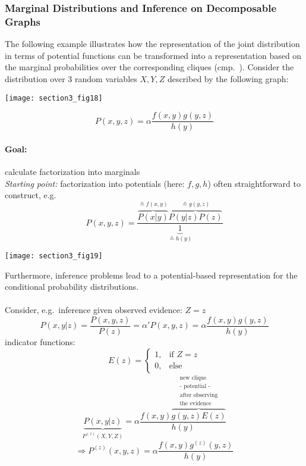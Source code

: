 \newpage 						%
\subsubsection{Marginal Distributions and Inference on Decomposable Graphs}
The following example illustrates how the representation of the joint
distribution in terms of potential functions can be transformed into a
representation based on the marginal probabilities over the
corresponding cliques
(cmp.~\cite[p.~84]{CowellEtAl2003}). Consider the distribution
over 3 random variables $X,Y,Z$ described by the following graph:

\begin{center} \texttt{[image: section3\_fig18]} \end{center}
\begin{equation}\label{eq:potentialRepresentation}
	P(x, y, z) = \alpha \frac{f(x, y) g(y, z)}{h(y)}
\end{equation}

\paragraph{Goal:} calculate factorization into marginals
\\
\emph{Starting point:} factorization into potentials (here: $f,g,h$) often straightforward to construct, e.g.
\begin{equation}
  P(x,y,z) = \frac{ \overbrace{P(x|y)}^{\corresponds f(x,y)}
    \overbrace{P(y|z)P(z)}^{\corresponds g(y,z)}}{
    \underbrace{1}_{\corresponds h(y)}}
\end{equation}
\begin{center} 
  \texttt{[image: section3\_fig19]} 
\end{center}
Furthermore, inference problems lead to a potential-based representation for
the conditional probability distributions. \\\\
Consider, e.g.\ inference given observed evidence: $Z=z$
\begin{equation}
  P(x,y|z) = \frac{P(x,y,z)}{P(z)} = \alpha' P(x,y,z)
  = \alpha \frac{f(x,y) g(y,z)}{h(y)}
\end{equation}
indicator functions:
\begin{equation}
  E(z) = \left \{ \begin{array}{ll}
      1, & \text{if } Z = z\\
      0, & \text{else}
    \end{array} \right.
\end{equation}
\begin{equation}
  \underbrace{P(x,y|z)}_{P^{(z)}(X,Y,Z)} = 
  \alpha \frac{f(x,y)
    \overbrace{g(y,z)E(z)}^{\substack{
        \text{new clique} \\
        \text{- potential -}\\
        \text{after observing} \\
        \text{the evidence}}
    }}{h(y)}
\end{equation}
\begin{equation}
  \Rightarrow P^{(z)}(x, y, z) = \alpha
  \frac{f(x,y)g^{(z)}(y,z)}{
    h(y)}
\end{equation}

